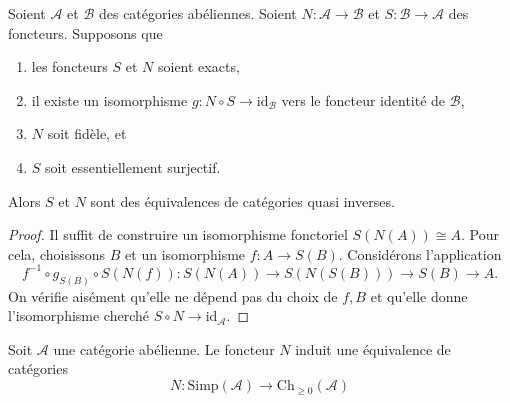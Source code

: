 \begin{lemma}
\label{lemma-S-N}
Soient $\mathcal{A}$ et $\mathcal{B}$ des catégories abéliennes.
Soient $N : \mathcal{A} \to \mathcal{B}$ et
$S : \mathcal{B} \to \mathcal{A}$ des foncteurs.
Supposons que
\begin{enumerate}
\item les foncteurs $S$ et $N$ soient exacts,
\item il existe un isomorphisme $g : N \circ S \to \text{id}_\mathcal{B}$
vers le foncteur identité de $\mathcal{B}$,
\item $N$ soit fidèle, et
\item $S$ soit essentiellement surjectif.
\end{enumerate}
Alors $S$ et $N$ sont des équivalences de catégories quasi inverses.
\end{lemma}

\begin{proof}
Il suffit de construire un isomorphisme fonctoriel
$S(N(A)) \cong A$. Pour cela, choisissons $B$ et un
isomorphisme $f : A  \to S(B)$.
Considérons l'application
$$
f^{-1} \circ g_{S(B)} \circ S(N(f)) :
S(N(A)) \to S(N(S(B))) \to S(B) \to A.
$$
On vérifie aisément qu'elle ne dépend pas du
choix de $f, B$ et qu'elle donne l'isomorphisme cherché
$S \circ N \to \text{id}_\mathcal{A}$.
\end{proof}

\begin{theorem}
\label{theorem-dold-kan}
Soit $\mathcal{A}$ une catégorie abélienne.
Le foncteur $N$ induit une équivalence de
catégories
$$
N :
\text{Simp}(\mathcal{A})
\longrightarrow
\text{Ch}_{\geq 0}(\mathcal{A})
$$
\end{theorem}

